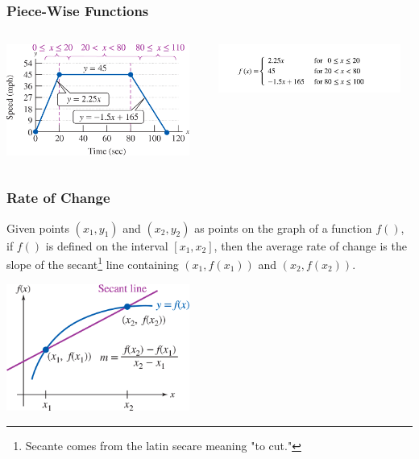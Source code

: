 \documentclass{beamer}
\begin{document}
\begin{frame}\frametitle{Piece-Wise Functions}
\begin{columns}
\begin{column}{6cm}
\begin{center}
\includegraphics[width=6cm]{fig/pwfunct1.png}
\end{center}
\end{column}
\begin{column}{5cm}
\begin{center}
\includegraphics[width=6cm]{fig/pwfunct2.jpg}
\end{center}
\end{column}
\end{columns}
\end{frame}

\begin{frame}\frametitle{Rate of Change}
Given points $(x_1,y_1)$ and $(x_2,y_2)$ as points on the graph of a function $f()$, if $f()$ is defined on the interval $[x_1,x_2]$, then the average rate of change is the slope of the secant\footnote{Secante comes from the latin secare meaning "to cut."} line containing $(x_1,f(x_1))$ and $(x_2,f(x_2))$. 

\begin{center}
\includegraphics[width=6cm]{fig/roc.png}
\end{center}
\end{frame}
\end{document}
